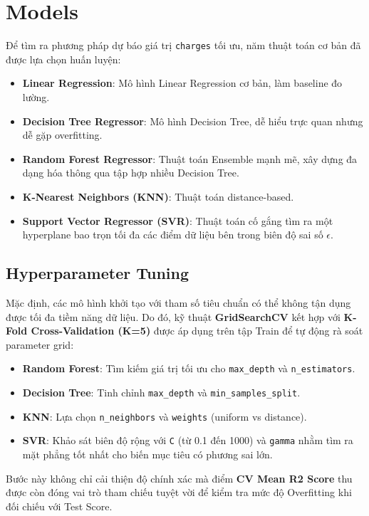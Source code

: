 \section{Models}

Để tìm ra phương pháp dự báo giá trị \texttt{charges} tối ưu, năm thuật toán cơ bản đã được lựa chọn huấn luyện:
\begin{itemize}
    \item \textbf{Linear Regression}: Mô hình Linear Regression cơ bản, làm baseline đo lường.
    \item \textbf{Decision Tree Regressor}: Mô hình Decision Tree, dễ hiểu trực quan nhưng dễ gặp overfitting.
    \item \textbf{Random Forest Regressor}: Thuật toán Ensemble mạnh mẽ, xây dựng đa dạng hóa thông qua tập hợp nhiều Decision Tree.
    \item \textbf{K-Nearest Neighbors (KNN)}: Thuật toán distance-based.
    \item \textbf{Support Vector Regressor (SVR)}: Thuật toán cố gắng tìm ra một hyperplane bao trọn tối đa các điểm dữ liệu bên trong biên độ sai số $\epsilon$.
\end{itemize}

\subsection{Hyperparameter Tuning}
Mặc định, các mô hình khởi tạo với tham số tiêu chuẩn có thể không tận dụng được tối đa tiềm năng dữ liệu. Do đó, kỹ thuật \textbf{GridSearchCV} kết hợp với \textbf{K-Fold Cross-Validation (K=5)} được áp dụng trên tập Train để tự động rà soát parameter grid:
\begin{itemize}
    \item \textbf{Random Forest}: Tìm kiếm giá trị tối ưu cho \texttt{max\_depth} và \texttt{n\_estimators}.
    \item \textbf{Decision Tree}: Tinh chỉnh \texttt{max\_depth} và \texttt{min\_samples\_split}.
    \item \textbf{KNN}: Lựa chọn \texttt{n\_neighbors} và \texttt{weights} (uniform vs distance).
    \item \textbf{SVR}: Khảo sát biên độ rộng với \texttt{C} (từ 0.1 đến 1000) và \texttt{gamma} nhằm tìm ra mặt phẳng tốt nhất cho biến mục tiêu có phương sai lớn.
\end{itemize}
Bước này không chỉ cải thiện độ chính xác mà điểm \textbf{CV Mean R2 Score} thu được còn đóng vai trò tham chiếu tuyệt vời để kiểm tra mức độ Overfitting khi đối chiếu với Test Score.
